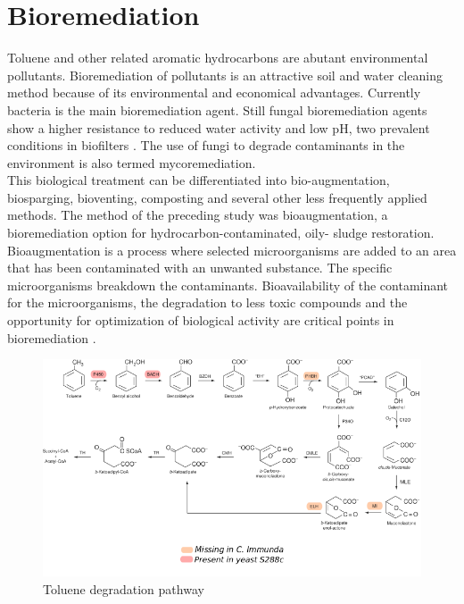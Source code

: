 \documentclass[12pt, a4paper]{report}
\begin{document}
\section{Bioremediation}
Toluene and other related aromatic hydrocarbons are abutant environmental pollutants. Bioremediation of pollutants is an attractive soil and water cleaning method because of its environmental and economical advantages. Currently bacteria is the main bioremediation agent. Still fungal bioremediation agents show a higher resistance to reduced water activity and low pH, two prevalent conditions in biofilters \cite{Luykx2003}. The use of fungi to degrade contaminants in the environment is also termed mycoremediation.\\
This biological treatment can be differentiated into bio-augmentation, biosparging, bioventing, composting and several other less frequently applied methods. The method of the preceding study was bioaugmentation, a bioremediation option for hydrocarbon-contaminated, oily- sludge restoration. Bioaugmentation is a process where selected microorganisms are added to an area that has been contaminated with an unwanted substance. The specific microorganisms breakdown the contaminants. Bioavailability of the contaminant for the microorganisms, the degradation to less toxic compounds and the opportunity for optimization of biological activity are critical points in bioremediation \cite{Poyntner2014}.  \\

\begin{figure}[H]
	\centering	
	\includegraphics[width=360pt]{pics/toluenpathway.png}
	\caption[Toluene degradation pathway]
	{Toluene degradation pathway \cite{Parales2008}}
	\label{Toluendeg}
\end{figure}
\end{document}
